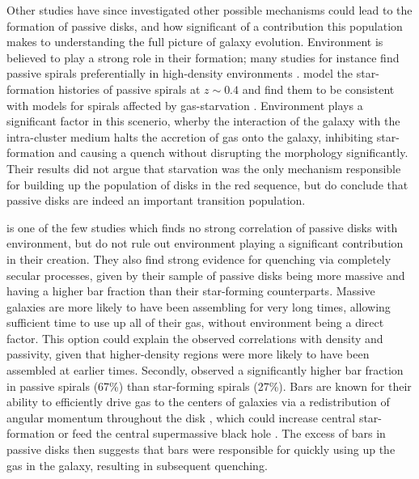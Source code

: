 \documentclass[useAMS,usenatbib]{mn2e}
\begin{document}
Other studies have since investigated other possible mechanisms could lead to the formation of passive disks, and how significant of a contribution this population makes to understanding the full picture of galaxy evolution. Environment is believed to play a strong role in their formation; many studies for instance find passive spirals preferentially in high-density environments \citep{Dressler1999, Poggianti1999, Goto2003, Deng2009, Hughes2009}. \citet{Moran2006} model the star-formation histories of passive spirals at $z\sim0.4$ and find them to be consistent with models for spirals affected by gas-starvation \citep{Larson1980, Quilis2000, Bekki2002}. Environment plays a significant factor in this scenerio, wherby the interaction of the galaxy with the intra-cluster medium halts the accretion of gas onto the galaxy, inhibiting star-formation and causing a quench without disrupting the morphology significantly. Their results did not argue that starvation was the only mechanism responsible for building up the population of disks in the red sequence, but do conclude that passive disks are indeed an important transition population.

\citet{Masters2010} is one of the few studies which finds no strong correlation of passive disks with environment, but do not rule out environment playing a significant contribution in their creation. They also find strong evidence for quenching via completely secular processes, given by their sample of passive disks being more massive and having a higher bar fraction than their star-forming counterparts. Massive galaxies are more likely to have been assembling for very long times, allowing sufficient time to use up all of their gas, without environment being a direct factor. This option could explain the observed correlations with density and passivity, given that higher-density regions were more likely to have been assembled at earlier times. Secondly, \citet{Masters2010} observed a significantly higher bar fraction in passive spirals (67\%) than star-forming spirals (27\%). Bars are known for their ability to efficiently drive gas to the centers of galaxies via a redistribution of angular momentum throughout the disk \citep{Sellwood1993,Shlosman1989,Ann2005}, which could increase central star-formation \citep{Hawarden1986,Ho1997} or feed the central supermassive black hole \citep{Athanassoula1992,Friedli1993}. The excess of bars in passive disks then suggests that bars were responsible for quickly using up the gas in the galaxy, resulting in subsequent quenching. 
\end{document}
